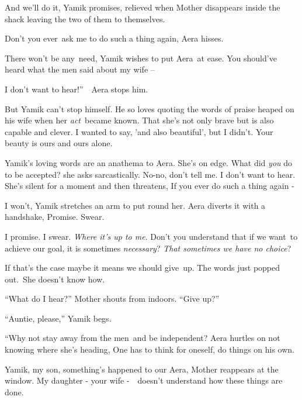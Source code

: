 \documentclass[letterpaper]{article}
\begin{document}
{\textquotedbl}And we'll do it,{\textquotedbl} Yamik promises, relieved when Mother disappears inside the shack leaving
the two of them to themselves. 

{\textquotedbl}Don't you ever~ask me to do such a thing again,{\textquotedbl} Aera hisses. 

{\textquotedbl}There won't be any~need,{\textquotedbl} Yamik wishes to put Aera\ at ease. {\textquotedbl}You should've
heard what the men said about my wife --{\textquotedbl} 

{\textquotedbl}I don't want to hear!''\ \ Aera stops him.\ 

But Yamik can't stop himself. He so loves quoting the words of praise heaped on his wife when her \textit{act}\ became
known. {\textquotedbl}That she's not only brave but is also capable and clever. I wanted to say, 'and also beautiful',
but I didn't. Your beauty is ours and ours alone.{\textquotedbl} ~

Yamik's loving words are an anathema to Aera. She's on edge. {\textquotedbl}What did \textit{you} do to be
accepted?{\textquotedbl} she asks sarcastically. {\textquotedbl}No-no, don't tell me. I don't want to
hear.{\textquotedbl} She's silent for a moment and then threatens, {\textquotedbl}If you ever do such a thing again
-{\textquotedbl}

{\textquotedbl}I won't,{\textquotedbl} Yamik stretches an arm to put round her. Aera diverts it with a handshake,
{\textquotedbl}Promise. Swear.{\textquotedbl} 

{\textquotedbl}I promise. I swear. \textit{Where it's up to me}. Don't you understand that if we want~to achieve our
goal, it is sometimes \textit{necessary}? \textit{That sometimes we have no choice}?{\textquotedbl} 

{\textquotedbl}If that's the case maybe it means we should give~up.{\textquotedbl} The words just popped out.\ She
doesn't know how.

{}``What do I hear?'' Mother shouts from indoors. ``Give up?'' 

{}``Auntie, please,'' Yamik begs.

{}``Why not stay away from the men~and be independent?{\textquotedbl} Aera hurtles on not knowing where she's heading,
{\textquotedbl}One has to think for oneself, do things on his own.{\textquotedbl}

{\textquotedbl}Yamik, my son, something's happened to our Aera,{\textquotedbl} Mother reappears at the window.
{\textquotedbl}My daughter - your wife -\ \ doesn't understand how these things are done.{\textquotedbl} 
\end{document}
